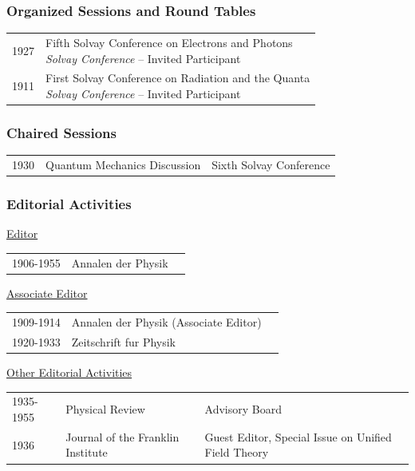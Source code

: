 \documentclass[martgin, line]{article}
\begin{document}
\subsubsection*{Organized Sessions and Round Tables}
\setlength{\extrarowheight}{.75em}
\begin{tabular}{lp{5.5in}}   
1927&
\parbox[t]{5.5in}{
    Fifth Solvay Conference on Electrons and Photons\\
  \textit{Solvay Conference}
   -- Invited Participant 
  }\\
1911&
\parbox[t]{5.5in}{
    First Solvay Conference on Radiation and the Quanta\\
  \textit{Solvay Conference}
   -- Invited Participant 
  }\\
\end{tabular}
\setlength{\extrarowheight}{0em}


\subsubsection*{Chaired Sessions}

\setlength{\extrarowheight}{.25em}
\begin{longtable}[l]{lll}
    1930&
  Quantum Mechanics Discussion&
  Sixth Solvay Conference\\
  \end{longtable}
\setlength{\extrarowheight}{0em}

\subsubsection*{Editorial Activities}

\underline{Editor}

\begin{tabular}{lll}
1906-1955&
Annalen der Physik
\\
\end{tabular}


\underline{Associate Editor}

\begin{tabular}{lll}
1909-1914&
Annalen der Physik (Associate Editor)
\\
1920-1933&
Zeitschrift fur Physik
\\
\end{tabular}

\underline{Other Editorial Activities}

\begin{tabular}{lll}
1935-1955&
Physical Review&
Advisory Board
\\
1936&
Journal of the Franklin Institute&
Guest Editor, Special Issue on Unified Field Theory
\\
\end{tabular}
\end{document}
